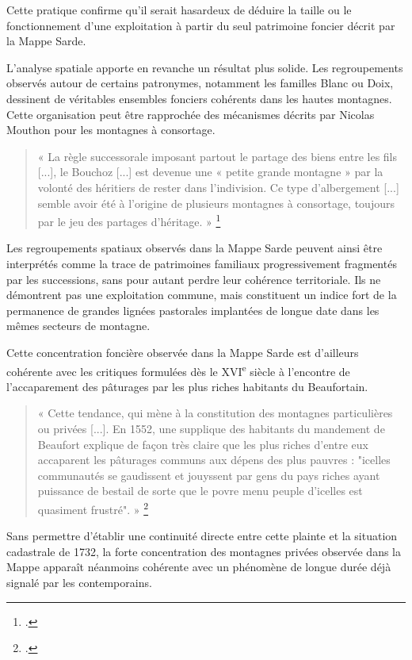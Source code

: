 \documentclass[12pt,a4paper]{report}
\begin{document}
	Cette pratique confirme qu'il serait hasardeux de déduire la taille ou le fonctionnement d'une exploitation à partir du seul patrimoine foncier décrit par la Mappe Sarde.
	
	L'analyse spatiale apporte en revanche un résultat plus solide. Les regroupements observés autour de certains patronymes, notamment les familles Blanc ou Doix, dessinent de véritables ensembles fonciers cohérents dans les hautes montagnes. Cette organisation peut être rapprochée des mécanismes décrits par Nicolas Mouthon pour les montagnes à consortage.
	
	\begin{quote}
		« La règle successorale imposant partout le partage des biens entre les fils [...], le Bouchoz [...] est devenue une « petite grande montagne » par la volonté des héritiers de rester dans l'indivision. Ce type d'albergement [...] semble avoir été à l'origine de plusieurs montagnes à consortage, toujours par le jeu des partages d'héritage. »
		\footcite[120]{Mouthon2019MontagnesMedievales}
	\end{quote}
	
	Les regroupements spatiaux observés dans la Mappe Sarde peuvent ainsi être interprétés comme la trace de patrimoines familiaux progressivement fragmentés par les successions, sans pour autant perdre leur cohérence territoriale. Ils ne démontrent pas une exploitation commune, mais constituent un indice fort de la permanence de grandes lignées pastorales implantées de longue date dans les mêmes secteurs de montagne.
	
	Cette concentration foncière observée dans la Mappe Sarde est d'ailleurs cohérente avec les critiques formulées dès le XVI\textsuperscript{e} siècle à l'encontre de l'accaparement des pâturages par les plus riches habitants du Beaufortain.
	
	\begin{quote}
		« Cette tendance, qui mène à la constitution des montagnes particulières ou privées [...]. En 1552, une supplique des habitants du mandement de Beaufort explique de façon très claire que les plus riches d'entre eux accaparent les pâturages communs aux dépens des plus pauvres : "icelles communautés se gaudissent et jouyssent par gens du pays riches ayant puissance de bestail de sorte que le povre menu peuple d'icelles est quasiment frustré". »
		\footcite[125]{Mouthon2019MontagnesMedievales}
	\end{quote}
	
	Sans permettre d'établir une continuité directe entre cette plainte et la situation cadastrale de 1732, la forte concentration des montagnes privées observée dans la Mappe apparaît néanmoins cohérente avec un phénomène de longue durée déjà signalé par les contemporains.
	
\end{document}
